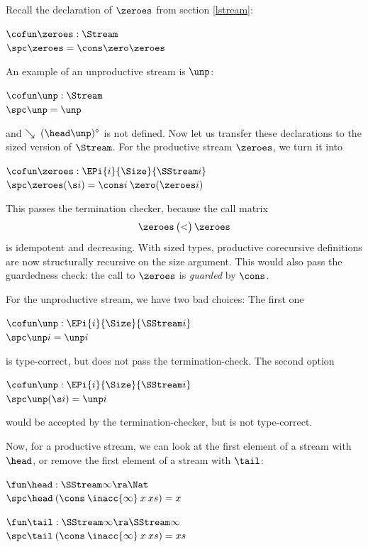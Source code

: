 Recall the declaration of $\zeroes$ from section \ref{lstream}: 
\begin{bsp}
$\cofun \zeroes: \Stream $ \\
$\spc \zeroes = \cons \zero \zeroes$
\end{bsp}
\noindent An example of an unproductive stream is $\unp$:
\begin{bsp}
$\cofun \unp : \Stream $ \\
$\spc \unp = \unp$
\end{bsp}
and $\wh\; {\clp{\head \unp}{\diamond}}$ is not defined.
Now let us transfer these declarations to the sized version of $\Stream$.
For the productive stream $\zeroes$, we turn it into
\begin{bsp}
$\cofun \zeroes: \EPi{i}{\Size}{\SStream i} $ \\
$\spc \zeroes (\s i) = \cons i \: \zero (\zeroes i)$
\end{bsp}
This passes the termination checker, because 
the call matrix
\[
\zeroes
\begin{pmatrix}
<    
\end{pmatrix}\zeroes
\] 
is idempotent and decreasing. With sized types, productive corecursive definitions are now structurally recursive on the size argument. This would also pass the guardedness check: the call to $\zeroes$ is \emph{guarded} by $\cons$.

For the unproductive stream, we have two bad choices:
The first one
\begin{bsp}
$\cofun \unp : \EPi{i}{\Size}{\SStream i}$ \\
$\spc \unp i =  \unp i$
\end{bsp}
is type-correct, but does not pass the termination-check.
The second option
\begin{bsp}
$\cofun \unp : \EPi{i}{\Size}{\SStream i}$ \\
$\spc \unp (\s i) = \unp i $
\end{bsp}
would be accepted by the termination-checker, but is not type-correct.

Now, for a productive stream, we can look at the first element of a stream with $\head$, or remove the first element of a stream with $\tail$:
\begin{bsp}
$\fun \head : \SStream \infty \ra \Nat$\\
$\spc \head \: (\cons \: \inacc{\infty} \: x \: xs) = x$

$\fun \tail :  \SStream \infty \ra \SStream \infty $\\
$\spc \tail \: (\cons \: \inacc{\infty} \: x \: xs) = xs$\\
\end{bsp}

